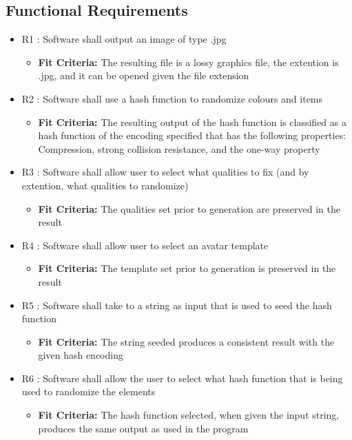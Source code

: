 \documentclass[12pt, titlepage]{article}
\begin{document}
\subsection{Functional Requirements}
\begin{itemize}
\item{R1 : Software shall output an image of type .jpg}
\begin{itemize}
\item{\textbf{Fit Criteria:} The resulting file is a lossy graphics file, the extention is .jpg, and it can be opened given the file extension}
\end{itemize}
\item{R2 : Software shall use a hash function to randomize colours and items}
\begin{itemize}
\item{\textbf{Fit Criteria:} The resulting output of the hash function is classified as a hash function of the encoding specified that has the following properties: Compression, strong collision resistance, and the one-way property}
\end{itemize}
\item{R3 : Software shall allow user to select what qualities to fix (and by extention, what qualities to randomize)}
\begin{itemize}
\item{\textbf{Fit Criteria:} The qualities set prior to generation are preserved in the result}
\end{itemize}
\item{R4 : Software shall allow user to select an avatar template}
\begin{itemize}
\item{\textbf{Fit Criteria:} The template set prior to generation is preserved in the result}
\end{itemize}
\item{R5 : Software shall take to a string as input that is used to seed the hash function}
\begin{itemize}
\item{\textbf{Fit Criteria:} The string seeded produces a consistent result with the given hash encoding}
\end{itemize}
\item{R6 : Software shall allow the user to select what hash function that is being used to randomize the elements}
\begin{itemize}
\item{\textbf{Fit Criteria:} The hash function selected, when given the input string, produces the same output as used in the program}

\end{itemize}
\end{itemize}
\end{document}
